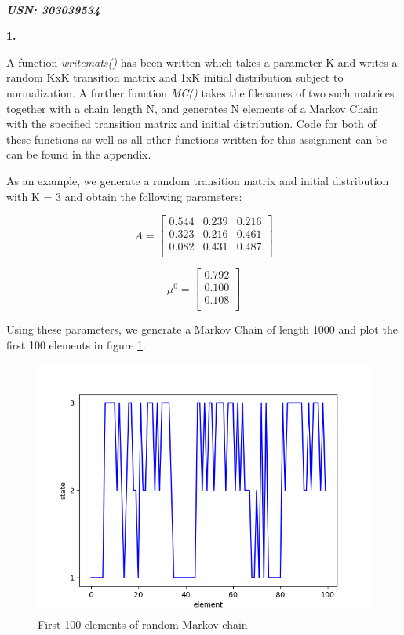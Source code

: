 \documentclass{article}
\begin{document}

\begin{center}
\textbf{\Large{}}\\
\vspace{0.8mm}
\textbf{\textit{\small{USN: 303039534}}}
\end{center}
\vspace{1.3mm}

\textbf{\large{1.}}

A function \textit{writemats()} has been written which takes a parameter K and writes a random KxK transition matrix and 1xK initial distribution subject to normalization.
A further function \textit{MC()} takes the filenames of two such matrices together with a chain length N, and generates N elements of a Markov Chain with the specified transition matrix and initial distribution.
Code for both of these functions as well as all other functions written for this assignment can be can be found in the appendix.

As an example, we generate a random transition matrix and initial distribution with K = 3 and obtain the following parameters:

\[
A = 
\begin{bmatrix}
   0.544 &  0.239 &  0.216 \\
   0.323 &  0.216 &  0.461 \\
   0.082 & 0.431 & 0.487 \\
\end{bmatrix}
\]

\[
\mu^0 = 
\begin{bmatrix}
   0.792 \\
   0.100  \\
   0.108  \\
\end{bmatrix}
\]

Using these parameters, we generate a Markov Chain of length 1000 and plot the first 100 elements in figure \ref{fig:MC}.


\begin{figure}[h]
\centering
\includegraphics[width = 0.5\linewidth, trim={0 0 0 0}, clip=true]{MC.png}
\caption{First 100 elements of random Markov chain}
\label{fig:MC}
\end{figure}
\end{document}
